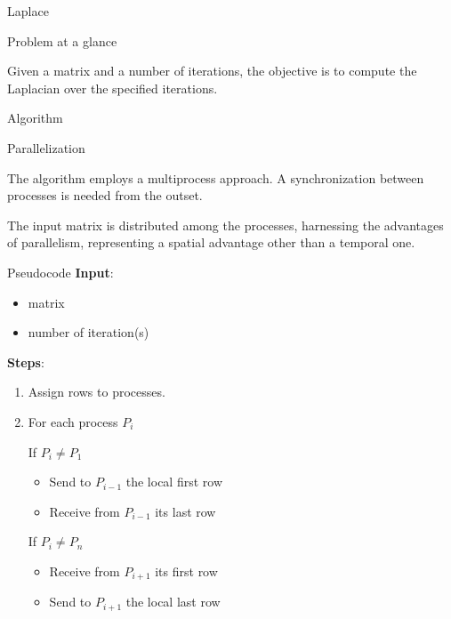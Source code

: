 \begin{chapter}{Laplace}
    \begin{section}{Problem at a glance}
        \par Given a matrix and a number of iterations, the objective is to compute the Laplacian over the specified iterations.
    \end{section}
    \begin{section}{Algorithm}
        \begin{subsection}{Parallelization}
            \par The algorithm employs a multiprocess approach. A synchronization between processes is needed from the outset.
            \par The input matrix is distributed among the processes, harnessing the advantages of parallelism, representing a spatial advantage other than a temporal one.
        \end{subsection}
        \begin{subsection}{Pseudocode}
            \textbf{Input}:
            \begin{itemize}
                \item matrix
                \item number of iteration(s)
            \end{itemize}
            \textbf{Steps}:
            \begin{enumerate}
                \item Assign rows to processes.
                \item For each process $P_i$
                \begin{enumerate}
                    \begin{item}
                        If $P_i \neq P_1$
                        \begin{itemize}
                            \item Send to $P_{i-1}$ the local first row
                            \item Receive from $P_{i-1}$ its last row
                        \end{itemize}
                    \end{item}
                    \begin{item}
                        If $P_i \neq P_n$
                        \begin{itemize}
                            \item Receive from $P_{i+1}$ its first row
                            \item Send to $P_{i+1}$ the local last row

\end{itemize}
\end{item}
\end{enumerate}
\end{enumerate}
\end{subsection}
\end{section}
\end{chapter}
